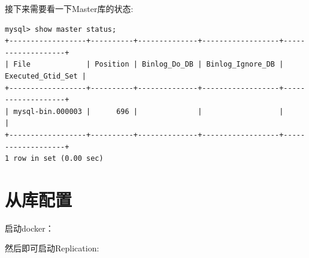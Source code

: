 \documentclass[12pt]{article}
\begin{document}
接下来需要看一下Master库的状态:

\begin{verbatim}
mysql> show master status;
+------------------+----------+--------------+------------------+-------------------+
| File             | Position | Binlog_Do_DB | Binlog_Ignore_DB | Executed_Gtid_Set |
+------------------+----------+--------------+------------------+-------------------+
| mysql-bin.000003 |      696 |              |                  |                   |
+------------------+----------+--------------+------------------+-------------------+
1 row in set (0.00 sec)
\end{verbatim}

\section{从库配置}\label{ux4eceux5e93ux914dux7f6e}

\begin{Shaded}
\begin{Highlighting}[]
\KeywordTok{[mysqld]}

\OtherTok{=}
\end{Highlighting}
\end{Shaded}

启动docker：

\begin{Shaded}
\begin{Highlighting}[]
\DataTypeTok{\textbackslash{}}
    \DataTypeTok{\textbackslash{}}
    \DataTypeTok{\textbackslash{}}
    \DataTypeTok{\textbackslash{}}
    \DataTypeTok{\textbackslash{}}
\end{Highlighting}
\end{Shaded}

然后即可启动Replication:
\end{document}
